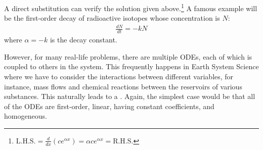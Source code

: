 A direct substitution can verify the solution given above.\footnote{$\text{L.H.S.} = \frac{d}{dx} (ce^{\alpha x}) = \alpha ce^{\alpha x} = \text{R.H.S.}$} A famous example will be the first-order decay of radioactive isotopes whose concentration is $N$:
\begin{align*}
\frac{dN}{dt} = -kN
\end{align*}
where $\alpha = -k$ is the decay constant.
\par
However, for many real-life problems, there are multiple ODEs, each of which is coupled to others in the system. This frequently happens in Earth System Science where we have to consider the interactions between different variables, for instance, mass flows and chemical reactions between the reservoirs of various substances. This naturally leads to a . Again, the simplest case would be that all of the ODEs are first-order, linear, having constant coefficients, and homogeneous.
